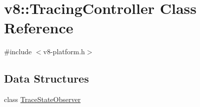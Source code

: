 \hypertarget{classv8_1_1TracingController}{}\section{v8\+:\+:Tracing\+Controller Class Reference}
\label{classv8_1_1TracingController}


{\ttfamily \#include $<$v8-\/platform.\+h$>$}

\subsection*{Data Structures}
\begin{DoxyCompactItemize}
\item 
class \mbox{\hyperlink{classv8_1_1TracingController_1_1TraceStateObserver}{Trace\+State\+Observer}}
\end{DoxyCompactItemize}
